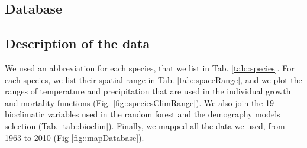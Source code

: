 \documentclass[letterpaper, 12pt]{article}
\theoremstyle{theo}
\begin{document}
\tableofcontents

\begin{refsection}
\begin{onehalfspace}

\section{Database} \label{app::database}
\subsection{Description of the data}
We used an abbreviation for each species, that we list in Tab. \ref{tab::species}. For each species, we list their spatial range in Tab. \ref{tab::spaceRange}, and we plot the ranges of temperature and precipitation that are used in the individual growth and mortality functions (Fig. \ref{fig::speciesClimRange}).  We also join the 19 bioclimatic variables used in the random forest and the demography models selection (Tab. \ref{tab::bioclim}). Finally, we mapped all the data we used, from 1963 to 2010 (Fig \ref{fig::mapDatabase}).


\end{onehalfspace}
\end{refsection}
\end{document}
